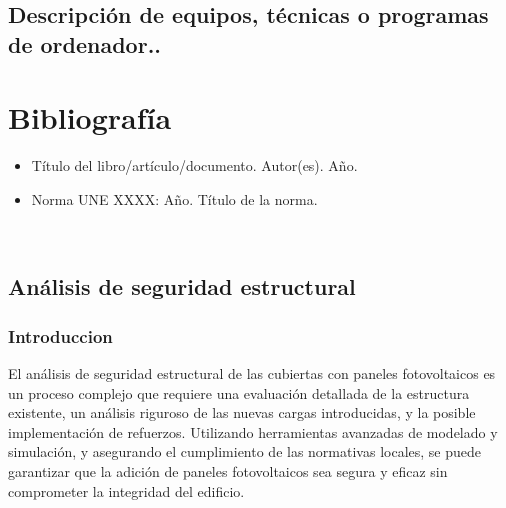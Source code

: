 \documentclass[a4paper,12pt]{article}
\begin{document}
\begin{Form}
\begin{table}[ht]
    \centering
    \caption{Una Tabla de ejemplo}
    \pgfplotstabletypeset[
        col sep=comma,
        every head row/.style={before row=\toprule, after row=\midrule},
        every last row/.style={after row=\bottomrule},
        string type %
    ]{\datosNoNumericos}
\end{table}


\subsection{Descripción de equipos, técnicas o programas de ordenador..}







\newpage
\section*{Bibliografía}
\begin{itemize}
    \item Título del libro/artículo/documento. Autor(es). Año.
    \item Norma UNE XXXX: Año. Título de la norma.
\end{itemize}



\
\subsection{Análisis de seguridad estructural}

\subsubsection*{Introduccion}
    El análisis de seguridad estructural de las cubiertas con paneles fotovoltaicos es un proceso complejo que requiere una evaluación detallada de la estructura existente, un análisis riguroso de las nuevas cargas introducidas, y la posible implementación de refuerzos. Utilizando herramientas avanzadas de modelado y simulación, y asegurando el cumplimiento de las normativas locales, se puede garantizar que la adición de paneles fotovoltaicos sea segura y eficaz sin comprometer la integridad del edificio.


\end{Form}
\end{document}
